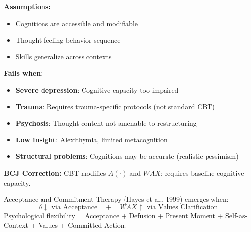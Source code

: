 \begin{tcolorbox}[colback=red!5!white, colframe=red!75!black, title=Boundary Condition: Where CBT Fails]
\textbf{Assumptions:}
\begin{itemize}[nosep]
\item Cognitions are accessible and modifiable
\item Thought-feeling-behavior sequence
\item Skills generalize across contexts
\end{itemize}

\textbf{Fails when:}
\begin{itemize}[nosep]
\item \textbf{Severe depression}: Cognitive capacity too impaired
\item \textbf{Trauma}: Requires trauma-specific protocols (not standard CBT)
\item \textbf{Psychosis}: Thought content not amenable to restructuring
\item \textbf{Low insight}: Alexithymia, limited metacognition
\item \textbf{Structural problems}: Cognitions may be accurate (realistic pessimism)
\end{itemize}

\textbf{BCJ Correction:} CBT modifies $A(\cdot)$ and $WAX$; requires baseline cognitive capacity.
\end{tcolorbox}


\begin{theorem}
\label{thm:act}
Acceptance and Commitment Therapy (Hayes et al., 1999) emerges when:
\begin{equation}
\boxed{\theta \downarrow \text{ via Acceptance} \quad + \quad WAX \uparrow \text{ via Values Clarification}}
\end{equation}
Psychological flexibility = Acceptance + Defusion + Present Moment + Self-as-Context + Values + Committed Action.
\end{theorem}

